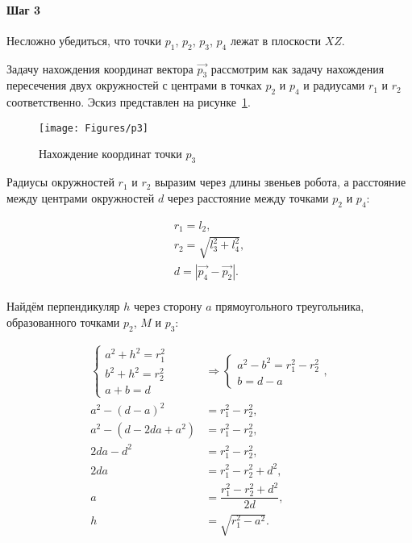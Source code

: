 \paragraph{Шаг 3}

Несложно убедиться, что точки $p_1$, $p_2$, $p_3$, $p_4$ лежат в плоскости $XZ$.

Задачу нахождения координат вектора $\overrightarrow{p_3}$ рассмотрим как задачу нахождения пересечения двух окружностей с центрами в точках $p_2$ и $p_4$ и радиусами $r_1$ и $r_2$ соответственно.
Эскиз представлен на рисунке~\ref{fig:ikp:p3}.

\begin{figure}[H]
    \centering
    \vspace{14pt}
    \texttt{[image: Figures/p3]}
    \caption{Нахождение координат точки $p_3$}
    \label{fig:ikp:p3}
\end{figure}

Радиусы окружностей $r_1$ и $r_2$ выразим через длины звеньев робота, а расстояние между центрами окружностей $d$ через расстояние между точками $p_2$ и $p_4$:

\begin{gather*}
    r_1 = l_2, \\
    r_2 = \sqrt{l_3^2 + l_4^2}, \\
    d = \left| \overrightarrow{p_4} - \overrightarrow{p_2} \right|.
\end{gather*} \\

Найдём перпендикуляр $h$ через сторону $a$ прямоугольного треугольника, образованного точками $p_2$, $M$ и $p_3$:

\begin{align*}
    \begin{cases}
        a^2 + h^2 = r_1^2 \\
        b^2 + h^2 = r_2^2 \\
        a + b = d
    \end{cases} & \Rightarrow
    \begin{cases}
        a^2 - b^2 = r_1^2 - r_2^2 \\
        b = d - a
    \end{cases}, \\
    a^2 - \left( d - a \right)^2 &= r_1^2 - r_2^2, \\
    a^2 - \left( d - 2da + a^2 \right) &= r_1^2 - r_2^2, \\
    2da - d^2 &= r_1^2 - r_2^2, \\
    2da &= r_1^2 - r_2^2 + d^2, \\
    a &= \dfrac{r_1^2 - r_2^2 + d^2}{2d}, \\
    h &= \sqrt{r_1^2 - a^2}.
\end{align*} \\

